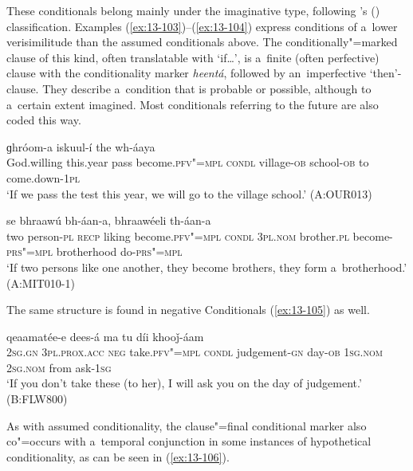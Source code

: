  These conditionals belong mainly under the imaginative type, following \citeauthor{thompsonetal2007}'s (\citeyear[259--260]{thompsonetal2007}) classification. Examples (\ref{ex:13-103})--(\ref{ex:13-104}) express conditions of a~lower verisimilitude than the assumed conditionals above. The conditionally"=marked clause of this kind, often translatable with `if{\ldots}', is a~finite (often perfective) clause with the conditionality marker \textit{heentá}, followed by an~imperfective `then'-clause. They describe a~condition that is probable or possible, although to a~certain extent imagined. Most conditionals referring to the future are also coded this way.

\begin{exe}
\ex
\label{ex:13-103}
  ɡhróom-a iskuul-í the wh-áaya \\
 God.willing this.year  pass become.\textsc{pfv"=mpl} \textsc{condl}  village-\textsc{ob} school-\textsc{ob} to come.down-\textsc{1pl} \\
\glt `If we pass the test this year, we will go to the village school.' (A:OUR013)

\ex
\label{ex:13-104}
 se bhraawú bh-áan-a,
bhraawéeli  th-áan-a \\
two person-\textsc{pl} \textsc{recp} liking become.\textsc{pfv"=mpl}  \textsc{condl } \textsc{3pl.nom} brother.\textsc{pl} become-\textsc{prs"=mpl} brotherhood do-\textsc{prs"=mpl} \\
\glt `If two persons like one another, they become brothers, they form a~brotherhood.' (A:MIT010-1) 
\end{exe}

The same structure is found in negative Conditionals (\ref{ex:13-105}) as well.

\begin{exe}
\ex
\label{ex:13-105}
  qeaamatée-e dees-á ma tu díi khooǰ-áam \\
\textsc{2sg.gn} \textsc{3pl.prox.acc} \textsc{neg} take.\textsc{pfv"=mpl} \textsc{condl} judgement-\textsc{gn} day-\textsc{ob} \textsc{1sg.nom} \textsc{2sg.nom} from ask-\textsc{1sg}  \\
\glt `If you don't take these (to her), I will ask you on the day of judgement.' (B:FLW800) 
\end{exe}

As with assumed conditionality, the clause"=final conditional marker also co"=occurs with a~temporal conjunction in some instances of hypothetical conditionality, as can be seen in (\ref{ex:13-106}). 

